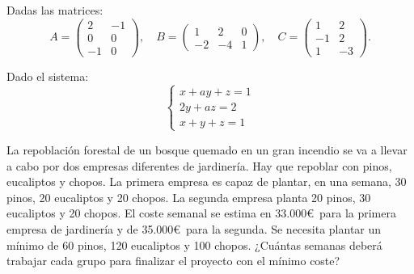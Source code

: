 \documentclass[addpoints,spanish, 12pt,a4paper]{exam}
\begin{document}
\begin{questions}

\question Dadas las matrices:
\[
A = \begin{pmatrix}
2 & -1  \\
0 & 0  \\
-1 & 0 
\end{pmatrix}, \quad
B = \begin{pmatrix}
1 & 2 & 0 \\
-2 & -4 & 1
\end{pmatrix}, \quad
C = \begin{pmatrix}
1 & 2 \\
-1 & 2 \\
1 & -3
\end{pmatrix}.
\]


\question Dado el sistema: 
\[
\begin{cases}
x + ay + z = 1 \\
2y + az = 2 \\
x + y + z = 1
\end{cases}
\]

\question[2] La repoblación forestal de un bosque quemado en un gran incendio se va a llevar a cabo por dos empresas diferentes de jardinería. Hay que repoblar con pinos, eucaliptos y chopos. La primera empresa es capaz de plantar, en una semana, 30 pinos, 20 eucaliptos y 20 chopos. La segunda empresa planta 20 pinos, 30 eucaliptos y 20 chopos. El coste semanal se estima en 33.000\euro \  para la primera empresa de jardinería y de 35.000\euro \  para la segunda. Se necesita plantar un mínimo de 60 pinos, 120 eucaliptos y 100 chopos. ¿Cuántas semanas deberá trabajar cada grupo para finalizar el proyecto con el mínimo coste?


\end{questions}
\end{document}
